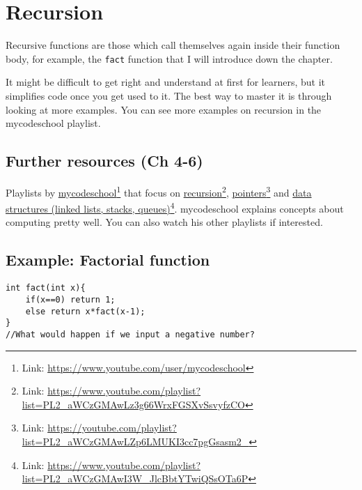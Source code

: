 \chapter{Recursion}

Recursive functions are those which call themselves again inside their function body, for example, the \texttt{fact} function that I will introduce down the chapter.

It might be difficult to get right and understand at first for learners, but it simplifies code once you get used to it. The best way to master it is through looking at more examples. You can see more examples on recursion in the mycodeschool playlist.

\section{Further resources (Ch 4-6)}

Playlists by 
\href{https://www.youtube.com/user/mycodeschool}{mycodeschool}\footnote{Link: \href{https://www.youtube.com/user/mycodeschool}{https://www.youtube.com/user/mycodeschool}}
that focus on 
\href{https://www.youtube.com/playlist?list=PL2\_aWCzGMAwLz3g66WrxFGSXvSsvyfzCO}{recursion}\footnote{Link: \href{https://www.youtube.com/playlist?list=PL2\_aWCzGMAwLz3g66WrxFGSXvSsvyfzCO}{https://www.youtube.com/playlist?list=PL2\_aWCzGMAwLz3g66WrxFGSXvSsvyfzCO}}, 
\href{https://youtube.com/playlist?list=PL2_aWCzGMAwLZp6LMUKI3cc7pgGsasm2_}{pointers}\footnote{Link: \href{https://youtube.com/playlist?list=PL2_aWCzGMAwLZp6LMUKI3cc7pgGsasm2_}{https://youtube.com/playlist?list=PL2\_aWCzGMAwLZp6LMUKI3cc7pgGsasm2\_}} and 
\href{https://www.youtube.com/playlist?list=PL2_aWCzGMAwI3W_JlcBbtYTwiQSsOTa6P}{data structures (linked lists, stacks, queues)}\footnote{Link: \href{https://www.youtube.com/playlist?list=PL2_aWCzGMAwI3W_JlcBbtYTwiQSsOTa6P}{https://www.youtube.com/playlist?list=PL2\_aWCzGMAwI3W\_JlcBbtYTwiQSsOTa6P}}.
mycodeschool explains concepts about computing pretty well. You can also watch his other playlists if interested.

\section{Example: Factorial function}

\begin{lstlisting}
int fact(int x){
    if(x==0) return 1;
    else return x*fact(x-1);
}
//What would happen if we input a negative number?
\end{lstlisting}

